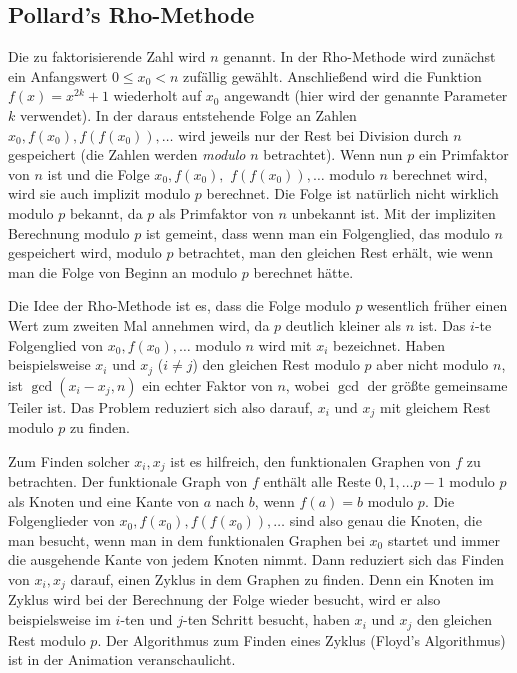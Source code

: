 \documentclass[a3paper, extrafontsizes, ngerman, 25pt]{memoir}
\begin{document}
\subsection{Pollard's Rho-Methode}

Die zu faktorisierende Zahl wird $n$ genannt. In der Rho-Methode wird zunächst ein Anfangswert $0 \le x_0 < n$ zufällig gewählt. Anschließend wird die Funktion $f(x) = x^{2k} + 1$ wiederholt auf $x_0$ angewandt (hier wird der genannte Parameter $k$ verwendet). In der daraus entstehende Folge an Zahlen $x_0, f(x_0), f(f(x_0)), \dots$ wird jeweils nur der Rest bei Division durch $n$ gespeichert (die Zahlen werden \emph{modulo} $n$ betrachtet).  Wenn nun $p$ ein Primfaktor von $n$ ist und die Folge $x_0, f(x_0),$ $f(f(x_0)), \dots$ modulo $n$ berechnet wird, wird sie auch implizit modulo $p$ berechnet. Die Folge ist natürlich nicht wirklich modulo $p$ bekannt, da $p$ als Primfaktor von $n$ unbekannt ist. Mit der impliziten Berechnung modulo $p$ ist gemeint, dass wenn man ein Folgenglied, das modulo $n$ gespeichert wird, modulo $p$ betrachtet, man den gleichen Rest erhält, wie wenn man die Folge von Beginn an modulo $p$ berechnet hätte.

Die Idee der Rho-Methode ist es, dass die Folge modulo $p$ wesentlich früher einen Wert zum zweiten Mal annehmen wird, da $p$ deutlich kleiner als $n$ ist. Das $i$-te Folgenglied von $x_0, f(x_0), \dots$ modulo $n$ wird mit $x_i$ bezeichnet. Haben beispielsweise $x_i$ und $x_j$ ($i \ne j$) den gleichen Rest modulo $p$ aber nicht modulo $n$, ist $\gcd(x_i - x_j, n)$ ein echter Faktor von $n$, wobei $\gcd$ der größte gemeinsame Teiler ist. Das Problem reduziert sich also darauf, $x_i$ und $x_j$ mit gleichem Rest modulo $p$ zu finden.

Zum Finden solcher $x_i, x_j$ ist es hilfreich, den funktionalen Graphen von $f$ zu betrachten. Der funktionale Graph von $f$ enthält alle Reste $0, 1, \dots p - 1$ modulo $p$ als Knoten und eine Kante von $a$ nach $b$, wenn $f(a) = b$ modulo $p$. Die Folgenglieder von $x_0, f(x_0), f(f(x_0)), \dots$ sind also genau die Knoten, die man besucht, wenn man in dem funktionalen Graphen bei $x_0$ startet und immer die ausgehende Kante von jedem Knoten nimmt. Dann reduziert sich das Finden von $x_i, x_j$ darauf, einen Zyklus in dem Graphen zu finden. Denn ein Knoten im Zyklus wird bei der Berechnung der Folge wieder besucht, wird er also beispielsweise im $i$-ten und $j$-ten Schritt besucht, haben $x_i$ und $x_j$ den gleichen Rest modulo $p$. Der Algorithmus zum Finden eines Zyklus (Floyd's Algorithmus) ist in der Animation veranschaulicht.
\end{document}
